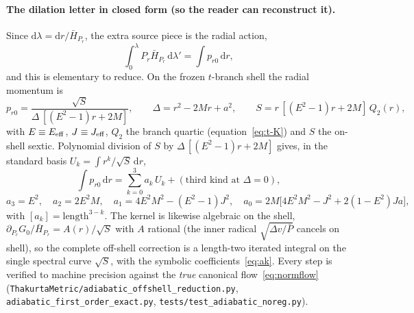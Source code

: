\documentclass[12pt]{iopart}
\theoremstyle{plain}
\theoremstyle{definition}
\theoremstyle{remark}
\newcommand{\dd}{\mathrm{d}}
\begin{document}
\paragraph{The dilation letter in closed form (so the reader can reconstruct it).}
Since $\dd\lambda=\dd r/\bar H_{P_r}$, the extra source piece is the radial action,
\begin{equation}
    \int_0^{\lambda}P_r\bar H_{P_r}\,\dd\lambda'=\int p_{r0}\,\dd r,
    \label{eq:dilation-action}
\end{equation}
and this is elementary to reduce. On the frozen $t$-branch shell the radial momentum is
\begin{equation}
    p_{r0}=\frac{\sqrt{S}}{\Delta\,[(E^2-1)r+2M]},\qquad
    \Delta=r^2-2Mr+a^2,\qquad S=r\,[(E^2-1)r+2M]\,Q_2(r),
    \label{eq:pr0-tbranch}
\end{equation}
with $E\equiv E_{\rm eff}$, $J\equiv J_{\rm eff}$, $Q_2$ the branch quartic (equation~\eqref{eq:t-K})
and $S$ the on-shell sextic. Polynomial division of $S$ by $\Delta\,[(E^2-1)r+2M]$ gives,
in the standard basis $U_k=\int r^k/\sqrt S\,\dd r$,
\begin{equation}
    \int p_{r0}\,\dd r=\sum_{k=0}^{3}a_k\,U_k+(\text{third kind at }\Delta=0),
    \label{eq:action-reduction}
\end{equation}
\begin{equation}
    a_3=E^2,\quad a_2=2E^2M,\quad a_1=4E^2M^2-(E^2-1)J^2,\quad
    a_0=2M\big[4E^2M^2-J^2+2(1-E^2)Ja\big],
    \label{eq:ak}
\end{equation}
with $[a_k]=\text{length}^{3-k}$. The kernel is likewise algebraic on the shell,
$\partial_{P_r}G_0/\bar H_{P_r}=A(r)/\sqrt S$ with $A$ rational (the inner radical
$\sqrt{\Delta v/\bar P}$ cancels on shell), so the complete off-shell correction is a
length-two iterated integral on the single spectral curve $\sqrt S$, with the symbolic
coefficients~\eqref{eq:ak}. Every step is verified to machine precision against the
\emph{true} canonical flow~\eqref{eq:normflow}
(\texttt{ThakurtaMetric/adiabatic\_offshell\_reduction.py},
\texttt{adiabatic\_first\_order\_exact.py}, \texttt{tests/test\_adiabatic\_noreg.py}).
\end{document}
